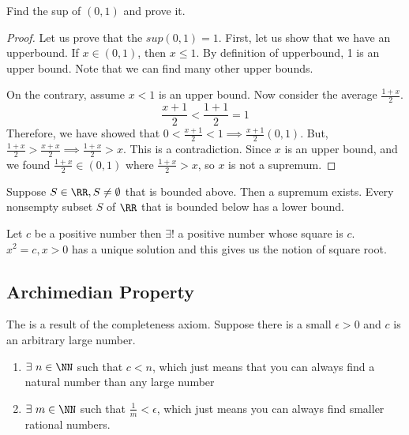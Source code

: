 \documentclass[12pt]{scrartcl}
\begin{document}
\begin{example}
  Find the sup of $(0, 1)$ and prove it. 
  \begin{proof}

    Let us prove that the $sup(0, 1) = 1$. First, let us show that we have 
    an upperbound. If $x \in (0, 1)$, then $x \leq 1$. By definition of upperbound,
    1 is an upper bound. Note that we can find many other upper bounds. 
    
    On the contrary, assume $x < 1$ is an upper bound. Now consider the average
    $\frac{1 + x}{2}$. 
    \[\frac{x + 1}{2} < \frac{1 + 1}{2} = 1\]
    Therefore, we have showed that $0 < \frac{x + 1}{2} < 1 \implies \frac{x + 1}{2} (0, 1)$. 
    But, $\frac{1 + x}{2} > \frac{x + x}{2} \implies \frac{1 + x}{2} > x$. This is a contradiction. Since 
    $x$ is an upper bound, and we found $\frac{1 + x}{2} \in (0, 1)$ where $\frac{1 + x}{2} > x$, 
    so $x$ is not a supremum.

  \end{proof}
\end{example}

\begin{theorem}
  Suppose $S \in \RR, S \neq \emptyset$ that is bounded above. Then a 
  supremum exists. Every nonsempty subset $S$ of $\RR$ that is bounded below has a
  lower bound.
\end{theorem}

\begin{note}
  Let $c$ be a positive number then $\exists !$ a positive number whose
  square is $c$. $x^2 = c, x > 0$ has a unique solution and this gives us 
  the notion of square root. 
\end{note}

\subsection{Archimedian Property}

\begin{definition}
  The  is a result of the completeness axiom. Suppose there 
  is a small $\epsilon > 0$ and $c$ is an arbitrary large number. 
  \begin{enumerate}
    \item $\exists \ n \in \NN$ such that $c < n$, which just means that you can always find a 
  natural number than any large number
    \item $\exists \ m \in \NN$ such that $\frac{1}{m} < \epsilon$, which just means you can always
  find smaller rational numbers.
  \end{enumerate}
\end{definition}
\end{document}
